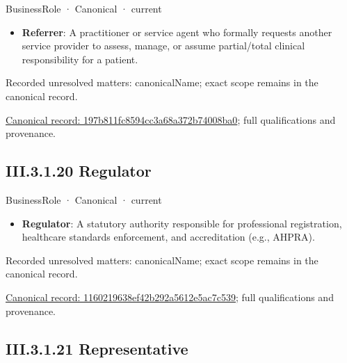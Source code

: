 \label{element:197b811fc8594cc3a68a372b74008ba0}
{\small BusinessRole · Canonical · current}\par

\begin{itemize}


\item \textbf{Referrer}: A practitioner or service agent who formally requests another service provider to assess, manage, or assume partial/total clinical responsibility for a patient.

\end{itemize}

{\small Recorded unresolved matters: canonicalName; exact scope remains in the canonical record.}\par
{\footnotesize \href{../../../../continuum/business/business-role/197b811fc8594cc3a68a372b74008ba0.md}{Canonical record: 197b811fc8594cc3a68a372b74008ba0}; full qualifications and provenance.}\par
\subsection*{III.3.1.20 Regulator}
\label{navigation:III.3.1.20}

\label{element:1160219638ef42b292a5612e5ac7c539}
{\small BusinessRole · Canonical · current}\par

\begin{itemize}


\item \textbf{Regulator}: A statutory authority responsible for professional registration, healthcare standards enforcement, and accreditation (e.g., AHPRA).

\end{itemize}

{\small Recorded unresolved matters: canonicalName; exact scope remains in the canonical record.}\par
{\footnotesize \href{../../../../continuum/business/business-role/1160219638ef42b292a5612e5ac7c539.md}{Canonical record: 1160219638ef42b292a5612e5ac7c539}; full qualifications and provenance.}\par
\subsection*{III.3.1.21 Representative}
\label{navigation:III.3.1.21}

